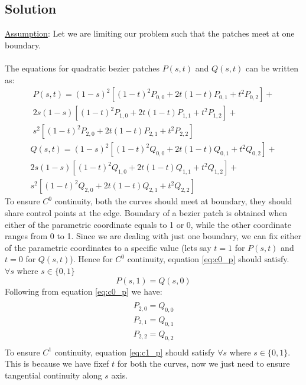 \documentclass[a4paper, 11pt]{article}
\begin{document}
\begin{enumerate}
\begin{enumerate}[label=\alph*.]
    \subsection*{Solution}
    \underline{Assumption}: Let we are limiting our problem such that the patches meet at one boundary. \\ \\
    The equations for quadratic bezier patches \(P(s,t)\) and \(Q(s,t)\) can be written as:
    \begin{multline}
    \label{eq:p(s,t)}
        P(s,t) = (1-s)^2[(1-t)^2 P_{0,0} + 2t(1-t) P_{0,1} + t^2 P_{0,2}] + \\ 2s(1-s)[(1-t)^2 P_{1,0} + 2t(1-t) P_{1,1} + t^2 P_{1,2}] + \\
        s^2[(1-t)^2 P_{2,0} + 2t(1-t) P_{2,1} + t^2 P_{2,2}]
    \end{multline}
    \begin{multline}
    \label{eq:q(s,t)}
        Q(s,t) = (1-s)^2[(1-t)^2 Q_{0,0} + 2t(1-t) Q_{0,1} + t^2 Q_{0,2}] + \\ 2s(1-s)[(1-t)^2 Q_{1,0} + 2t(1-t) Q_{1,1} + t^2 Q_{1,2}] + \\
        s^2[(1-t)^2 Q_{2,0} + 2t(1-t) Q_{2,1} + t^2 Q_{2,2}]
    \end{multline}
    To ensure \(C^0\) continuity,  both the curves should meet at boundary, they should share control points at the edge. Boundary of a bezier patch is obtained when either of the parametric coordinate equals to 1 or 0, while the other coordinate ranges from 0 to 1. Since we are dealing with just one boundary, we can fix either of the parametric coordinates to a specific value (lets say $t=1$ for $P(s,t)$ and $t=0$ for $Q(s,t)$). Hence for \(C^0\) continuity, equation \ref{eq:c0_p} should satisfy.\\ $\forall s$ where $s \in \{0,1\}$
    \begin{equation}
        \label{eq:c0_p}
        P(s,1) = Q(s,0)
    \end{equation}
    Following from equation \ref{eq:c0_p} we have:
    \begin{multline}
        \label{c0_p1}
        \\
        P_{2,0} = Q_{0,0} \\
        P_{2,1} = Q_{0,1} \\
        P_{2,2} = Q_{0,2} \\
    \end{multline}
    To ensure \(C^1\) continuity, equation \ref{eq:c1_p} should satisfy $\forall s$ where $ s \in \{0,1\}$. This is because we have fixef $t$ for both the curves, now we just need to ensure tangential continuity along $s$ axis. 

\end{enumerate}
\end{enumerate}
\end{document}
